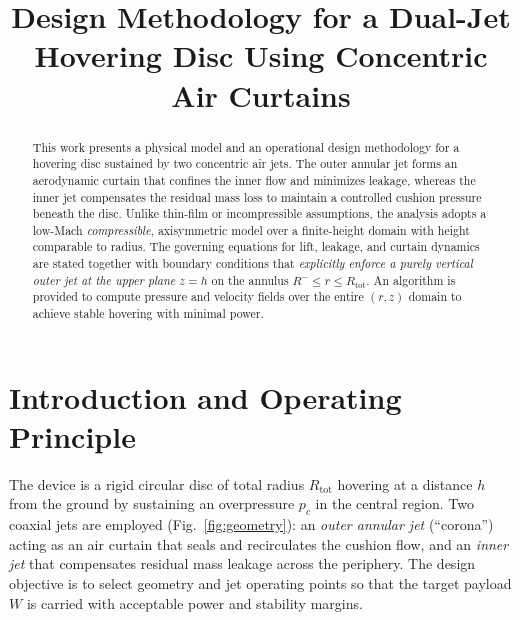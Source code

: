 \documentclass[11pt,a4paper]{article}
\title{Design Methodology for a Dual-Jet Hovering Disc Using Concentric Air Curtains}
\author{ }
\date{ }
\begin{document}
\maketitle

\begin{abstract}
This work presents a physical model and an operational design methodology for a hovering disc sustained by two concentric air jets. The outer annular jet forms an aerodynamic curtain that confines the inner flow and minimizes leakage, whereas the inner jet compensates the residual mass loss to maintain a controlled cushion pressure beneath the disc. Unlike thin-film or incompressible assumptions, the analysis adopts a low-Mach \emph{compressible}, axisymmetric model over a finite-height domain with height comparable to radius. The governing equations for lift, leakage, and curtain dynamics are stated together with boundary conditions that \emph{explicitly enforce a purely vertical outer jet at the upper plane} $z=h$ on the annulus $R^-\le r\le R_{\text{tot}}$. An algorithm is provided to compute pressure and velocity fields over the entire $(r,z)$ domain to achieve stable hovering with minimal power.
\end{abstract}

\section{Introduction and Operating Principle}
The device is a rigid circular disc of total radius $R_{\text{tot}}$ hovering at a distance $h$ from the ground by sustaining an overpressure $p_c$ in the central region. Two coaxial jets are employed (Fig.~\ref{fig:geometry}): an \emph{outer annular jet} (``corona'') acting as an air curtain that seals and recirculates the cushion flow, and an \emph{inner jet} that compensates residual mass leakage across the periphery. The design objective is to select geometry and jet operating points so that the target payload $W$ is carried with acceptable power and stability margins.
\end{document}
